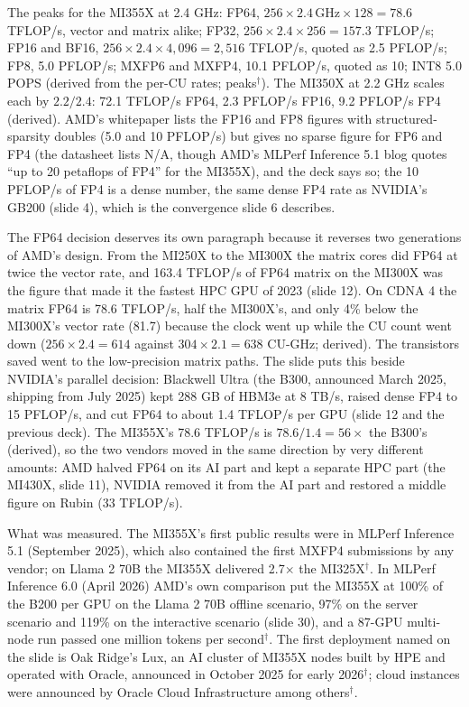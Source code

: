 \documentclass[11pt,letterpaper]{article}
\begin{document}
The peaks for the MI355X at 2.4 GHz: FP64, $256 \times 2.4\,\text{GHz} \times 128 = 78.6$ TFLOP/s, vector and matrix alike; FP32, $256 \times 2.4 \times 256 = 157.3$ TFLOP/s; FP16 and BF16, $256 \times 2.4 \times 4{,}096 = 2{,}516$ TFLOP/s, quoted as 2.5 PFLOP/s; FP8, 5.0 PFLOP/s; MXFP6 and MXFP4, 10.1 PFLOP/s, quoted as 10; INT8 5.0 POPS (derived from the per-CU rates; peaks$^\dagger$). The MI350X at 2.2 GHz scales each by $2.2/2.4$: 72.1 TFLOP/s FP64, 2.3 PFLOP/s FP16, 9.2 PFLOP/s FP4 (derived). AMD's whitepaper lists the FP16 and FP8 figures with structured-sparsity doubles (5.0 and 10 PFLOP/s) but gives no sparse figure for FP6 and FP4 (the datasheet lists N/A, though AMD's MLPerf Inference 5.1 blog quotes ``up to 20 petaflops of FP4'' for the MI355X), and the deck says so; the 10 PFLOP/s of FP4 is a dense number, the same dense FP4 rate as NVIDIA's GB200 (slide 4), which is the convergence slide 6 describes.

The FP64 decision deserves its own paragraph because it reverses two generations of AMD's design. From the MI250X to the MI300X the matrix cores did FP64 at twice the vector rate, and 163.4 TFLOP/s of FP64 matrix on the MI300X was the figure that made it the fastest HPC GPU of 2023 (slide 12). On CDNA 4 the matrix FP64 is 78.6 TFLOP/s, half the MI300X's, and only 4\% below the MI300X's vector rate (81.7) because the clock went up while the CU count went down ($256 \times 2.4 = 614$ against $304 \times 2.1 = 638$ CU-GHz; derived). The transistors saved went to the low-precision matrix paths. The slide puts this beside NVIDIA's parallel decision: Blackwell Ultra (the B300, announced March 2025, shipping from July 2025) kept 288 GB of HBM3e at 8 TB/s, raised dense FP4 to 15 PFLOP/s, and cut FP64 to about 1.4 TFLOP/s per GPU (slide 12 and the previous deck). The MI355X's 78.6 TFLOP/s is $78.6/1.4 = 56\times$ the B300's (derived), so the two vendors moved in the same direction by very different amounts: AMD halved FP64 on its AI part and kept a separate HPC part (the MI430X, slide 11), NVIDIA removed it from the AI part and restored a middle figure on Rubin (33 TFLOP/s).

What was measured. The MI355X's first public results were in MLPerf Inference 5.1 (September 2025), which also contained the first MXFP4 submissions by any vendor; on Llama 2 70B the MI355X delivered 2.7$\times$ the MI325X$^\dagger$. In MLPerf Inference 6.0 (April 2026) AMD's own comparison put the MI355X at 100\% of the B200 per GPU on the Llama 2 70B offline scenario, 97\% on the server scenario and 119\% on the interactive scenario (slide 30), and a 87-GPU multi-node run passed one million tokens per second$^\dagger$. The first deployment named on the slide is Oak Ridge's Lux, an AI cluster of MI355X nodes built by HPE and operated with Oracle, announced in October 2025 for early 2026$^\dagger$; cloud instances were announced by Oracle Cloud Infrastructure among others$^\dagger$.
\end{document}
